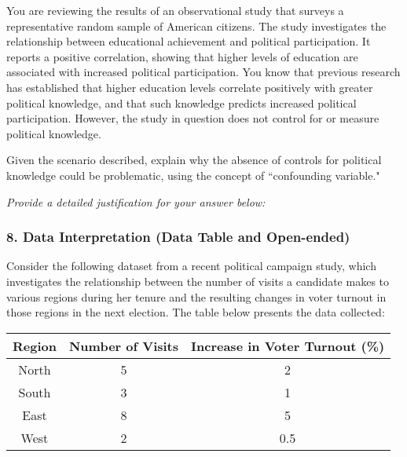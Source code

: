 \documentclass{article}
\begin{document}
You are reviewing the results of an observational study that surveys a representative random sample of American citizens. The study investigates the relationship between educational achievement and political participation. It reports a positive correlation, showing that higher levels of education are associated with increased political participation. You know that previous research has established that higher education levels correlate positively with greater political knowledge, and that such knowledge predicts increased political participation. However, the study in question does not control for or measure political knowledge.
\par Given the scenario described, explain why the absence of controls for political knowledge could be problematic, using the concept of ``confounding variable." \newline
    \par \emph{Provide a detailed justification for your answer below:}
    \begin{center}
    \end{center}

\subsubsection*{8. Data Interpretation (Data Table and Open-ended)}

Consider the following dataset from a recent political campaign study, which investigates the relationship between the number of visits a candidate makes to various regions during her tenure and the resulting changes in voter turnout in those regions in the next election. The table below presents the data collected:

\begin{center}
\begin{tabular}{|c|c|c|}
\hline
Region & Number of Visits & Increase in Voter Turnout (\%) \\
\hline
North & 5 & 2 \\
South & 3 & 1 \\
East & 8 & 5 \\
West & 2 & 0.5 \\
\hline
\end{tabular}
\end{center}
\end{document}
